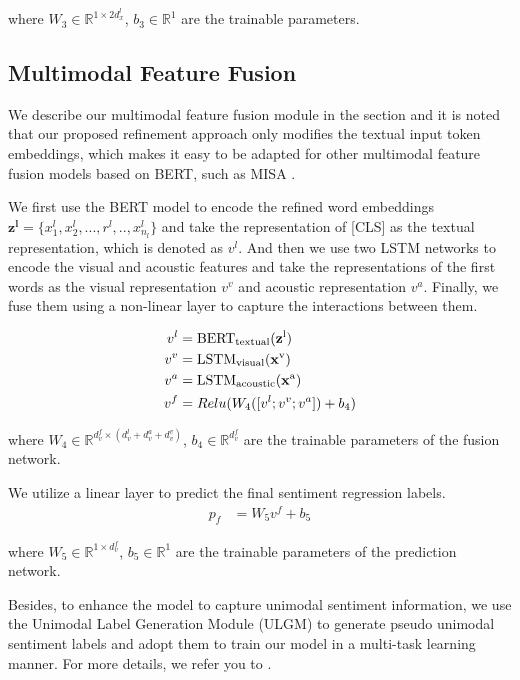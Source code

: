 \documentclass[11pt]{article}
\begin{document}
where $W_{3} \in \mathbb R^{1 \times 2d_x^l} $, $b_3 \in \mathbb R^1$ are the trainable parameters.


\subsection{Multimodal Feature Fusion}

We describe our multimodal feature fusion module in the section and it is noted that our proposed refinement approach only modifies the textual input token embeddings, which makes it easy to be adapted for other multimodal feature fusion models based on BERT, such as MISA \cite{10.1145/3394171.3413678}.

We first use the BERT model to encode the refined word embeddings $\mathbf{z^l} = \{x^l_1, x^l_2, ..., r^l, .., x^l_{n_l}\}$ and take the representation of [CLS] as the textual representation, which is denoted as $v^l$. And then we use two LSTM networks to encode the visual and acoustic features and take the representations of the first words as the visual representation $v^v$ and acoustic representation $v^a$. Finally, we fuse them using a non-linear layer to capture the interactions between them. 

\begin{equation}
\begin{aligned}
v^l &=\rm {BERT_{textual}}(\mathbf z^l) \\
v^v &=\rm {LSTM_{visual}}(\mathbf x^v) \\
v^a &=\rm {LSTM_{acoustic}}(\mathbf x^a) \\
v^f &= Relu(W_4([v^l;v^v;v^a])+b_4)
\end{aligned}
\end{equation}

where $W_{4} \in \mathbb R^{d_v^f \times (d_v^l + d_v^a + d_v^v)} $, $b_4 \in \mathbb R^{d_v^f}$ are the trainable parameters of the fusion network.

We utilize a linear layer to predict the final sentiment regression labels.
\begin{equation}
\begin{aligned}
p_f &= W_5v^f+b_5
\end{aligned}
\end{equation}

where $W_{5} \in \mathbb R^{1 \times d_v^f} $, $b_5 \in \mathbb R^1$ are the trainable parameters of the prediction network.

Besides, to enhance the model to capture unimodal sentiment information,  we use the Unimodal Label Generation Module (ULGM) \cite{Yu_Xu_Yuan_Wu_2021} to generate pseudo unimodal sentiment labels and adopt them to train our model in a multi-task learning manner. For more details, we refer you to \citet{Yu_Xu_Yuan_Wu_2021}.
\end{document}
